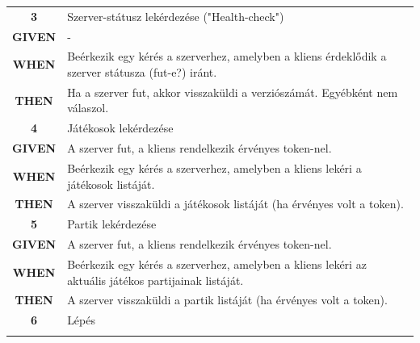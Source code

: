 \documentclass[twoside, a4paper, 12pt]{article}
\begin{document}
\begin{longtable}[c]{|c|p{14cm}|}
\rowcolor[HTML]{CBCEFB} 
\textbf{3}
&	Szerver-státusz lekérdezése ("Health-check")
\\ \nobreakhline

\textbf{GIVEN} &
-
\\ \nobreakhline

\textbf{WHEN} &
Beérkezik egy kérés a szerverhez, amelyben a kliens érdeklődik a szerver státusza (fut-e?) iránt.
\\
\nobreakhline

\textbf{THEN} &
Ha a szerver fut, akkor visszaküldi a verziószámát. Egyébként nem válaszol.
\\
\hline

\rowcolor[HTML]{CBCEFB} 
\textbf{4}
&	Játékosok lekérdezése
\\ \nobreakhline

\textbf{GIVEN} &
A szerver fut, a kliens rendelkezik érvényes token-nel.
\\ \nobreakhline

\textbf{WHEN} &
Beérkezik egy kérés a szerverhez, amelyben a kliens lekéri a játékosok listáját.
\\
\nobreakhline

\textbf{THEN} &
A szerver visszaküldi a játékosok listáját (ha érvényes volt a token).
\\
\hline

\rowcolor[HTML]{CBCEFB} 
\textbf{5}
&	Partik lekérdezése
\\ \nobreakhline

\textbf{GIVEN} &
A szerver fut, a kliens rendelkezik érvényes token-nel.
\\ \nobreakhline

\textbf{WHEN} &
Beérkezik egy kérés a szerverhez, amelyben a kliens lekéri az aktuális játékos partijainak listáját.
\\
\nobreakhline

\textbf{THEN} &
A szerver visszaküldi a partik listáját (ha érvényes volt a token).
\\
\hline

\rowcolor[HTML]{CBCEFB} 
\textbf{6}
&	Lépés
\\ \nobreakhline


\end{longtable}
\end{document}

